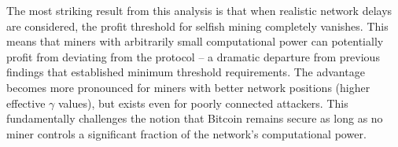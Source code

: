 \documentclass[conference]{IEEEtran}
\begin{document}
The most striking result from this analysis is that when realistic network delays are considered, the profit threshold for selfish mining completely vanishes. This means that miners with arbitrarily small computational power can potentially profit from deviating from the protocol – a dramatic departure from previous findings that established minimum threshold requirements. The advantage becomes more pronounced for miners with better network positions (higher effective $\gamma$ values), but exists even for poorly connected attackers. This fundamentally challenges the notion that Bitcoin remains secure as long as no miner controls a significant fraction of the network's computational power.




\end{document}
